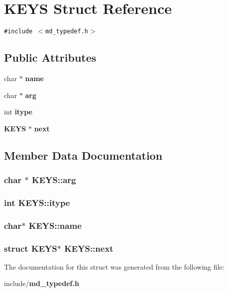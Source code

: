 \section{KEYS Struct Reference}
\label{structKEYS}
{\tt \#include $<$md\_\-typedef.h$>$}

\subsection*{Public Attributes}
\begin{CompactItemize}
\item 
char $\ast$ {\bf name}
\item 
char $\ast$ {\bf arg}
\item 
int {\bf itype}
\item 
{\bf KEYS} $\ast$ {\bf next}
\end{CompactItemize}


\subsection{Member Data Documentation}
\subsubsection{\setlength{\rightskip}{0pt plus 5cm}char $\ast$ {\bf KEYS::arg}}\label{structKEYS_86bb249cff977b36ab76bdbadb7dec13}


\subsubsection{\setlength{\rightskip}{0pt plus 5cm}int {\bf KEYS::itype}}\label{structKEYS_7b0818a172bb7b4f3a05d936000b7168}


\subsubsection{\setlength{\rightskip}{0pt plus 5cm}char$\ast$ {\bf KEYS::name}}\label{structKEYS_d8d47b927e3ce67285ecd5b649aec4ea}


\subsubsection{\setlength{\rightskip}{0pt plus 5cm}struct {\bf KEYS}$\ast$ {\bf KEYS::next}}\label{structKEYS_2261fe833690241f568662269be1f679}




The documentation for this struct was generated from the following file:\begin{CompactItemize}
\item 
include/{\bf md\_\-typedef.h}\end{CompactItemize}
